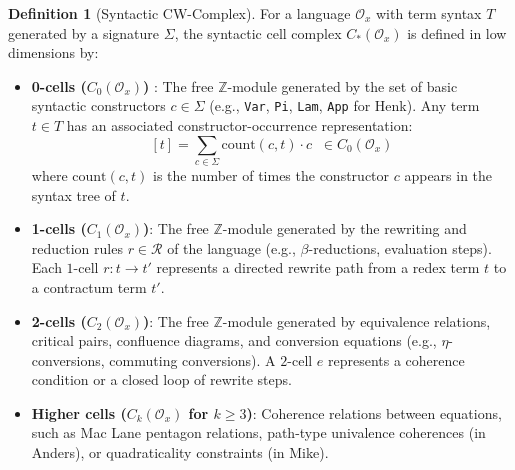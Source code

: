 \documentclass{article}
\theoremstyle{definition}
\newtheorem{definition}{Definition}[section]
\theoremstyle{plain}
\begin{document}
\begin{definition}[Syntactic CW-Complex]
For a language $\mathcal{O}_x$ with term syntax $T$ generated by a signature $\Sigma$, the syntactic cell complex $C_*(\mathcal{O}_x)$ is defined in low dimensions by:
\begin{itemize}
    \item \textbf{0-cells
    ($C_0(\mathcal{O}_x)$) }: The free $\mathbb{Z}$-module generated by the set of basic syntactic
      constructors $c \in \Sigma$ (e.g., \texttt{Var}, \texttt{Pi}, \texttt{Lam}, \texttt{App} for Henk).
      Any term $t \in T$ has an associated constructor-occurrence representation:
    \[
    [t] = \sum_{c \in \Sigma} \mathrm{count}(c, t) \cdot c \;\; \in C_0(\mathcal{O}_x)
    \]
    where $\mathrm{count}(c, t)$ is the number of times the constructor $c$ appears in the syntax tree of $t$.
    \item \textbf{1-cells
    ($C_1(\mathcal{O}_x)$)}: The free $\mathbb{Z}$-module generated by the rewriting and reduction rules
    $r \in \mathcal{R}$ of the language (e.g., $\beta$-reductions, evaluation steps). Each $1$-cell $r : t \to t'$
    represents a directed rewrite path from a redex term $t$ to a contractum term $t'$.
    \item \textbf{2-cells
    ($C_2(\mathcal{O}_x)$)}: The free $\mathbb{Z}$-module generated by equivalence relations, critical pairs,
    confluence diagrams, and conversion equations (e.g., $\eta$-conversions, commuting conversions). A $2$-cell
    $e$ represents a coherence condition or a closed loop of rewrite steps.
    \item \textbf{Higher cells
    ($C_k(\mathcal{O}_x)$ for $k \geq 3$)}: Coherence relations between equations, such as Mac Lane pentagon
    relations, path-type univalence coherences (in Anders), or quadraticality constraints (in Mike).
\end{itemize}
\end{definition}
\end{document}

